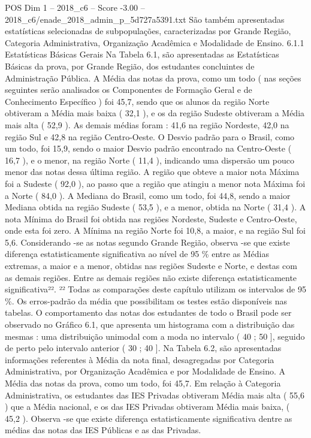 \begin{textsample}{POS Dim 1 – 2018\_c6 – Score -3.00 – 2018\_c6/enade\_2018\_admin\_p\_5d727a5391.txt}
São também apresentadas estatísticas selecionadas de subpopulações, caracterizadas por Grande Região, Categoria Administrativa, Organização Acadêmica e Modalidade de Ensino. 6.1.1 Estatísticas Básicas Gerais Na Tabela 6.1, são apresentadas as Estatísticas Básicas da prova, por Grande Região, dos estudantes concluintes de Administração Pública.
A Média das notas da prova, como um todo ( nas seções seguintes serão analisados os Componentes de Formação Geral e de Conhecimento Específico ) foi 45,7, sendo que os alunos da região Norte obtiveram a Média mais baixa ( 32,1 ), e os da região Sudeste obtiveram a Média mais alta ( 52,9 ).
As demais médias foram : 41,6 na região Nordeste, 42,0 na região Sul e 42,8 na região Centro-Oeste.
O Desvio padrão para o Brasil, como um todo, foi 15,9, sendo o maior Desvio padrão encontrado na Centro-Oeste ( 16,7 ), e o menor, na região Norte ( 11,4 ), indicando uma dispersão um pouco menor das notas dessa última região.
A região que obteve a maior nota Máxima foi a Sudeste ( 92,0 ), ao passo que a região que atingiu a menor nota Máxima foi a Norte ( 84,0 ).
A Mediana do Brasil, como um todo, foi 44,8, sendo a maior Mediana obtida na região Sudeste ( 53,5 ), e a menor, obtida na Norte ( 31,4 ).
A nota Mínima do Brasil foi obtida nas regiões Nordeste, Sudeste e Centro-Oeste, onde esta foi zero.
A Mínima na região Norte foi 10,8, a maior, e na região Sul foi 5,6.
Considerando -se as notas segundo Grande Região, observa -se que existe diferença estatisticamente significativa ao nível de 95 \% entre as Médias extremas, a maior e a menor, obtidas nas regiões Sudeste e Norte, e destas com as demais regiões.
Entre as demais regiões não existe diferença estatisticamente significativa²². ²² Todas as comparações deste capítulo utilizam os intervalos de 95 \%.
Os erros-padrão da média que possibilitam os testes estão disponíveis nas tabelas.
O comportamento das notas dos estudantes de todo o Brasil pode ser observado no Gráfico 6.1, que apresenta um histograma com a distribuição das mesmas : uma distribuição unimodal com a moda no intervalo ( 40 ; 50 ], seguido de perto pelo intervalo anterior ( 30 ; 40 ].
Na Tabela 6.2, são apresentadas informações referentes à Média da nota final, desagregadas por Categoria Administrativa, por Organização Acadêmica e por Modalidade de Ensino.
A Média das notas da prova, como um todo, foi 45,7.
Em relação à Categoria Administrativa, os estudantes das IES Privadas obtiveram Média mais alta ( 55,6 ) que a Média nacional, e os das IES Privadas obtiveram Média mais baixa, ( 45,2 ).
Observa -se que existe diferença estatisticamente significativa dentre as médias das notas das IES Públicas e as das Privadas.

\end{textsample}
